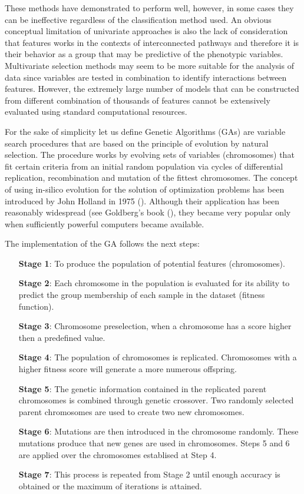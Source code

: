 {{{{ These methods have demonstrated to perform well, however, in some
  cases they can be ineffective regardless of the classification
  method used. An obvious conceptual limitation of univariate
  approaches is also the lack of consideration that features works in
  the contexts of interconnected pathways and therefore it is their
  behavior as a group that may be predictive of the phenotypic
  variables. Multivariate selection methods may seem to be more
  suitable for the analysis of data since variables are tested in
  combination to identify interactions between features. However, the
  extremely large number of models that can be constructed from
  different combination of thousands of features cannot be extensively
  evaluated using standard computational resources.  }

{ For the sake of simplicity let us define Genetic Algorithms (GAs)
  are variable search procedures that are based on the principle of
  evolution by natural selection. The procedure works by evolving sets
  of variables (chromosomes) that fit certain criteria from an initial
  random population via cycles of differential replication,
  recombination and mutation of the fittest chromosomes. The concept
  of using in-silico evolution for the solution of optimization
  problems has been introduced by John Holland in 1975
  (\cite{holland1975adaptation}). Although their application has been
  reasonably widespread (see Goldberg\textquoteright s book
  (\cite{goldberg1989genetic}), they became very popular only when
  sufficiently powerful computers became available.  }

{
The implementation of the GA follows the next steps:
\begin{itemize}
 \item [\textbf{Stage 1}:]{To produce the population of potential features (chromosomes).}
 \item [\textbf{Stage 2}:]{Each chromosome in the population is evaluated for its ability to
predict the group membership of each sample in the dataset (fitness function).}
 \item [\textbf{Stage 3}:]{Chromosome preselection, when a chromosome has 
 a score higher then a predefined value.}
 \item [\textbf{Stage 4}:]{The population of chromosomes is replicated. 
 Chromosomes with a higher fitness score will 
 generate a more numerous offspring.}
 \item [\textbf{Stage 5}:]{The genetic information contained in the replicated parent
chromosomes is combined through genetic crossover. Two randomly selected
parent chromosomes are used to create two new chromosomes.}
 \item [\textbf{Stage 6}:]{Mutations are then introduced in the chromosome randomly. 
 These mutations produce that new genes are used in chromosomes.
 Steps 5 and 6 are applied over the chromosomes establised at Step 4.}
  \item [\textbf{Stage 7}:]{This process is repeated from Stage 2 until 
  enough accuracy is obtained or the maximum of iterations is attained.}
\end{itemize}

}}}}
